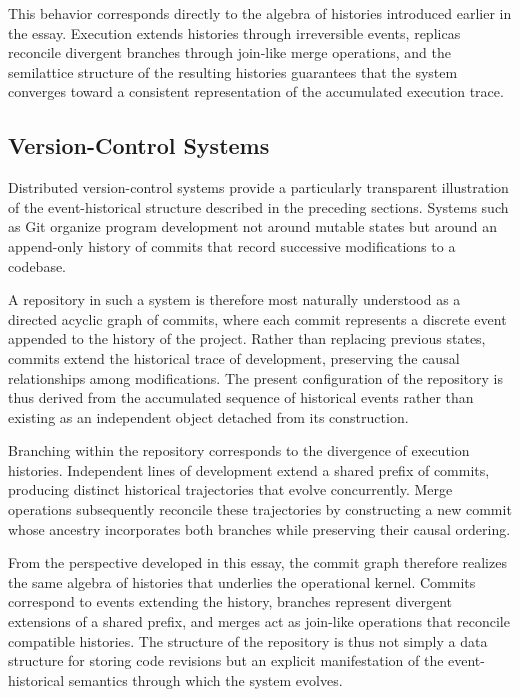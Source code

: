 \documentclass[12pt]{article}
\begin{document}
This behavior corresponds directly to the algebra
of histories introduced earlier in the essay.
Execution extends histories through irreversible
events, replicas reconcile divergent branches
through join-like merge operations, and the
semilattice structure of the resulting histories
guarantees that the system converges toward a
consistent representation of the accumulated
execution trace.

\subsection{Version-Control Systems}

Distributed version-control systems provide a particularly
transparent illustration of the event-historical structure
described in the preceding sections. Systems such as Git
organize program development not around mutable states
but around an append-only history of commits that record
successive modifications to a codebase.

A repository in such a system is therefore most naturally
understood as a directed acyclic graph of commits, where
each commit represents a discrete event appended to the
history of the project. Rather than replacing previous
states, commits extend the historical trace of development,
preserving the causal relationships among modifications.
The present configuration of the repository is thus derived
from the accumulated sequence of historical events rather
than existing as an independent object detached from its
construction.

Branching within the repository corresponds to the
divergence of execution histories. Independent lines of
development extend a shared prefix of commits, producing
distinct historical trajectories that evolve concurrently.
Merge operations subsequently reconcile these trajectories
by constructing a new commit whose ancestry incorporates
both branches while preserving their causal ordering.

From the perspective developed in this essay, the commit
graph therefore realizes the same algebra of histories that
underlies the operational kernel. Commits correspond to
events extending the history, branches represent divergent
extensions of a shared prefix, and merges act as join-like
operations that reconcile compatible histories. The
structure of the repository is thus not simply a data
structure for storing code revisions but an explicit
manifestation of the event-historical semantics through
which the system evolves.
\end{document}
